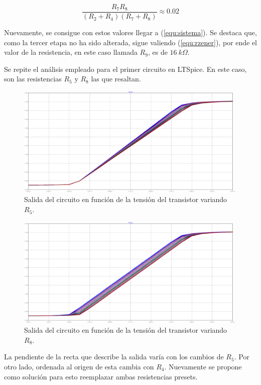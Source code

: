 \documentclass[a4paper]{article}
\begin{document}
\[
	\frac{R_7 R_8}{\left(R_2 + R_4 \right)\left(R_7 + R_8 \right)} \approx 0.02
\]

Nuevamente, se consigue con estos valores llegar a (\ref{equ:sistema}). Se destaca que, como la tercer etapa no ha sido alterada, sigue valiendo (\ref{equ:rzener}), por ende el valor de la resistencia, en este caso llamada $R_9$, es de $16 \ k\Omega$.

Se repite el análisis empleado para el primer circuito en LTSpice. En este caso, son las resistencias $R_5$ y $R_8$ las que resaltan.

\begin{figure}[H]
	\centering
	\includegraphics[width=0.99\textwidth]{Ejercicio6/Imagenes/StepR5-M2.png}
	\caption{Salida del circuito en función de la tensión del transistor variando $R_5$.}
	\label{fig:r5-M2}
\end{figure}

\begin{figure}[H]
	\centering
	\includegraphics[width=0.99\textwidth]{Ejercicio6/Imagenes/StepR8-M2.png}
	\caption{Salida del circuito en función de la tensión del transistor variando $R_8$.}
	\label{fig:r8-M2}
\end{figure}

La pendiente de la recta que describe la salida varía con los cambios de $R_5$. Por otro lado, ordenada al origen de esta cambia con $R_4$. Nuevamente se propone como solución para esto reemplazar ambas resistencias presets.
\end{document}
